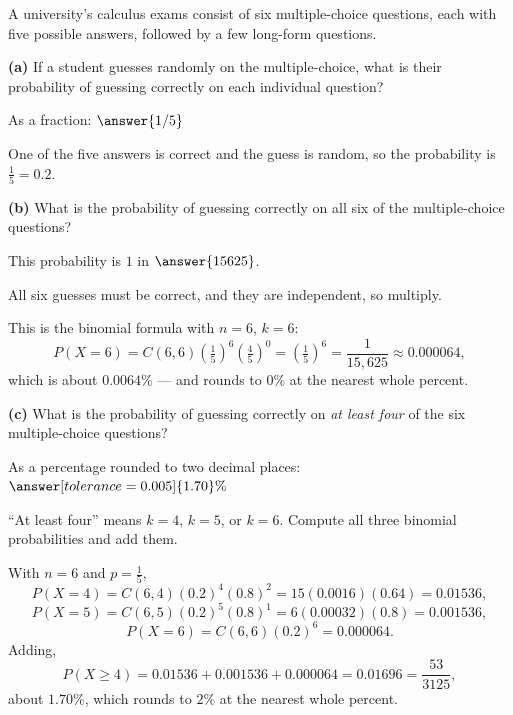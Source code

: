 \documentclass[12pt]{ximera}
\begin{document}
\begin{problem}
A university's calculus exams consist of six multiple-choice questions, each with
five possible answers, followed by a few long-form questions.

\begin{prompt}
\textbf{(a)} If a student guesses randomly on the multiple-choice, what is their
probability of guessing correctly on each individual question?

As a fraction: $\answer{1/5}$

\begin{feedback}
One of the five answers is correct and the guess is random, so the probability is
$\frac15=0.2$.
\end{feedback}
\end{prompt}

\begin{prompt}
\textbf{(b)} What is the probability of guessing correctly on all six of the
multiple-choice questions?

This probability is $1$ in $\answer{15625}$.

\begin{hint}
All six guesses must be correct, and they are independent, so multiply.
\end{hint}

\begin{feedback}
This is the binomial formula with $n=6$, $k=6$:
\[
P(X=6)=C(6,6)\left(\tfrac15\right)^6\left(\tfrac45\right)^0=\left(\tfrac15\right)^6
=\frac{1}{15{,}625}\approx 0.000064,
\]
which is about $0.0064\%$ --- and rounds to $0\%$ at the nearest whole percent.
\end{feedback}
\end{prompt}

\begin{prompt}
\textbf{(c)} What is the probability of guessing correctly on \emph{at least four} of
the six multiple-choice questions?

As a percentage rounded to two decimal places: $\answer[tolerance=0.005]{1.70}\%$

\begin{hint}
``At least four'' means $k=4$, $k=5$, or $k=6$. Compute all three binomial
probabilities and add them.
\end{hint}

\begin{feedback}
With $n=6$ and $p=\frac15$,
\[
P(X=4)=C(6,4)(0.2)^4(0.8)^2 = 15(0.0016)(0.64)=0.01536,
\]
\[
P(X=5)=C(6,5)(0.2)^5(0.8)^1 = 6(0.00032)(0.8)=0.001536,
\]
\[
P(X=6)=C(6,6)(0.2)^6 = 0.000064.
\]
Adding,
\[
P(X\ge 4)=0.01536+0.001536+0.000064=0.01696=\frac{53}{3125},
\]
about $1.70\%$, which rounds to $2\%$ at the nearest whole percent.
\end{feedback}
\end{prompt}
\end{problem}
\end{document}
